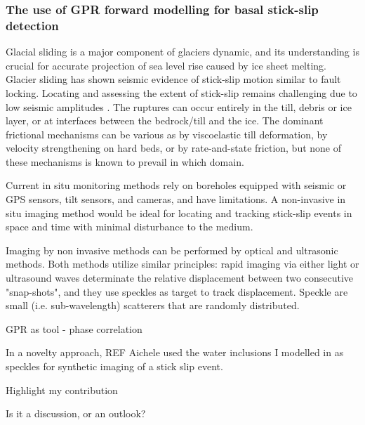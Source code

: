 \subsubsection{The use of GPR forward modelling for basal stick-slip detection}

Glacial sliding is a major component of glaciers dynamic, and its understanding is crucial for accurate projection of sea level rise caused by ice sheet melting. Glacier sliding has shown seismic evidence of stick-slip motion similar to fault locking. Locating and assessing the extent of stick-slip remains challenging due to low seismic amplitudes \citep{Graff&al2021}. The ruptures can occur entirely in the till, debris or ice layer, or at interfaces between the bedrock/till and the ice.
The dominant frictional mechanisms can be various as by viscoelastic till deformation, by velocity strengthening on hard beds, or by rate-and-state friction, but none of these mechanisms is known to prevail in which domain.

Current in situ monitoring methods rely on boreholes equipped with seismic or GPS sensors, tilt sensors, and cameras, and have limitations. A non-invasive in situ imaging method would be ideal for locating and tracking stick-slip events in space and time with minimal disturbance to the medium.

Imaging by non invasive methods can be performed by optical and ultrasonic methods. Both methods utilize similar principles: rapid imaging via either light or ultrasound waves determinate the relative displacement between two consecutive "snap-shots", and they use speckles as target to track displacement. Speckle are small (i.e. sub-wavelength) scatterers that are randomly distributed. 

GPR as tool - phase correlation

In a novelty approach, REF Aichele used the water inclusions I modelled in \cite{Ogier&al2023} as speckles for synthetic imaging of a stick slip event.

Highlight my contribution

Is it a discussion, or an outlook?



